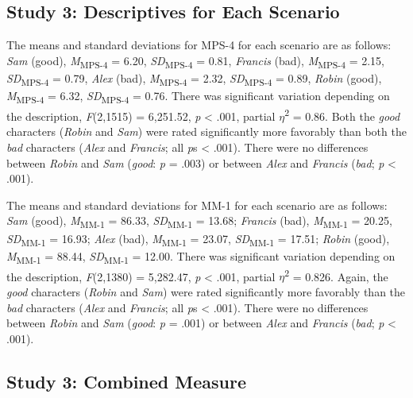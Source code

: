 \documentclass[
  man,floatsintext]{apa6}
\begin{document}
\subsection{Study 3: Descriptives for Each Scenario}\label{study-3-descriptives-for-each-scenario}

The means and standard deviations for MPS-4 for each scenario are as follows:
\emph{Sam} (good),
\emph{M}\textsubscript{MPS-4} = 6.20, \emph{SD}\textsubscript{MPS-4} = 0.81,
\emph{Francis} (bad),
\emph{M}\textsubscript{MPS-4} = 2.15, \emph{SD}\textsubscript{MPS-4} = 0.79,
\emph{Alex} (bad),
\emph{M}\textsubscript{MPS-4} = 2.32, \emph{SD}\textsubscript{MPS-4} = 0.89,
\emph{Robin} (good),
\emph{M}\textsubscript{MPS-4} = 6.32, \emph{SD}\textsubscript{MPS-4} = 0.76. There was significant variation depending on the description, \emph{F}(2,1515) = 6,251.52, \emph{p} \textless{} .001, partial \(\eta\)\textsuperscript{2} = 0.86. Both the \emph{good} characters (\emph{Robin} and \emph{Sam}) were rated significantly more favorably than both the \emph{bad} characters (\emph{Alex} and \emph{Francis}; all \emph{p}s \textless{} .001). There were no differences between \emph{Robin} and \emph{Sam} (\emph{good}: \emph{p} = .003) or between \emph{Alex} and \emph{Francis} (\emph{bad}; \emph{p} \textless{} .001).

The means and standard deviations for MM-1 for each scenario are as follows:
\emph{Sam} (good),
\emph{M}\textsubscript{MM-1} = 86.33, \emph{SD}\textsubscript{MM-1} = 13.68;
\emph{Francis} (bad),
\emph{M}\textsubscript{MM-1} = 20.25, \emph{SD}\textsubscript{MM-1} = 16.93;
\emph{Alex} (bad),
\emph{M}\textsubscript{MM-1} = 23.07, \emph{SD}\textsubscript{MM-1} = 17.51;
\emph{Robin} (good),
\emph{M}\textsubscript{MM-1} = 88.44, \emph{SD}\textsubscript{MM-1} = 12.00. There was significant variation depending on the description, \emph{F}(2,1380) = 5,282.47, \emph{p} \textless{} .001, partial \(\eta\)\textsuperscript{2} = 0.826. Again, the \emph{good} characters (\emph{Robin} and \emph{Sam}) were rated significantly more favorably than the \emph{bad} characters (\emph{Alex} and \emph{Francis}; all \emph{p}s \textless{} .001). There were no differences between \emph{Robin} and \emph{Sam} (\emph{good}: \emph{p} = .001) or between \emph{Alex} and \emph{Francis} (\emph{bad}; \emph{p} \textless{} .001).

\subsection{Study 3: Combined Measure}\label{study-3-combined-measure}
\end{document}
